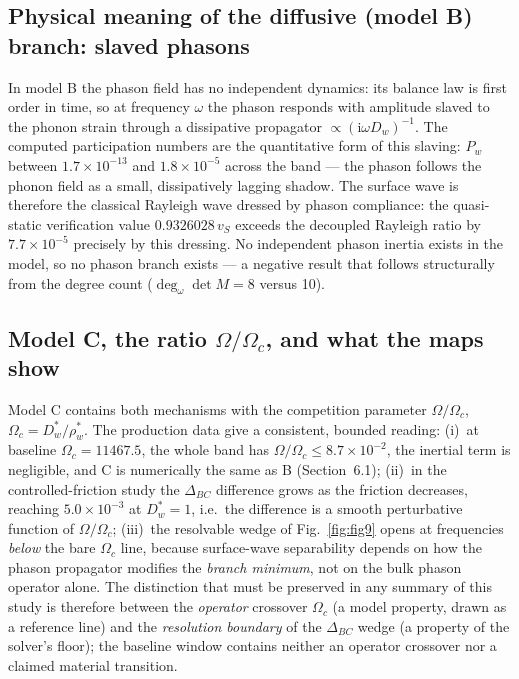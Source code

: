 \documentclass[11pt]{article}
\newcommand{\om}{\omega}
\newcommand{\Om}{\Omega}
\newcommand{\Dw}{D_w}
\newcommand{\rw}{\rho_w}
\begin{document}
\subsection{Physical meaning of the diffusive (model B) branch: slaved phasons}

In model B the phason field has no independent dynamics: its balance law is first order in time, so at frequency $\om$ the phason responds with amplitude slaved to the phonon strain through a dissipative propagator $\propto(\mathrm{i}\om\Dw)^{-1}$. The computed participation numbers are the quantitative form of this slaving: $P_w$ between $1.7\times10^{-13}$ and $1.8\times10^{-5}$ across the band --- the phason follows the phonon field as a small, dissipatively lagging shadow. The surface wave is therefore the classical Rayleigh wave dressed by phason compliance: the quasi-static verification value $0.9326028\,v_S$ exceeds the decoupled Rayleigh ratio by $7.7\times10^{-5}$ precisely by this dressing. No independent phason inertia exists in the model, so no phason branch exists --- a negative result that follows structurally from the degree count ($\deg_\om\det M=8$ versus 10).

\subsection{Model C, the ratio $\Om/\Om_c$, and what the maps show}

Model C contains both mechanisms with the competition parameter $\Om/\Om_c$, $\Om_c=\Dw^*/\rw^*$. The production data give a consistent, bounded reading: (i)~at baseline $\Om_c=11467.5$, the whole band has $\Om/\Om_c\le8.7\times10^{-2}$, the inertial term is negligible, and C is numerically the same as B (Section~6.1); (ii)~in the controlled-friction study the $\Delta_{BC}$ difference grows as the friction decreases, reaching $5.0\times10^{-3}$ at $D_w^*=1$, i.e.\ the difference is a smooth perturbative function of $\Om/\Om_c$; (iii)~the resolvable wedge of Fig.~\ref{fig:fig9} opens at frequencies \emph{below} the bare $\Om_c$ line, because surface-wave separability depends on how the phason propagator modifies the \emph{branch minimum}, not on the bulk phason operator alone. The distinction that must be preserved in any summary of this study is therefore between the \emph{operator} crossover $\Om_c$ (a model property, drawn as a reference line) and the \emph{resolution boundary} of the $\Delta_{BC}$ wedge (a property of the solver's floor); the baseline window contains neither an operator crossover nor a claimed material transition.
\end{document}
